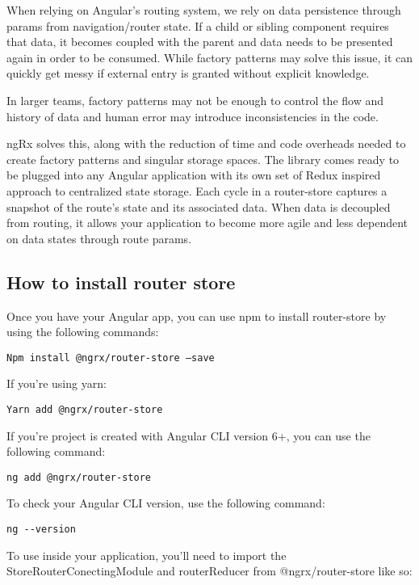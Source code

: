 When relying on Angular’s routing system, we rely on data persistence through
params from navigation/router state. If a child or sibling component requires
that data, it becomes coupled with the parent and data needs to be presented
again in order to be consumed. While factory patterns may solve this issue, it
can quickly get messy if external entry is granted without explicit knowledge.

In larger teams, factory patterns may not be enough to control the flow and
history of data and human error may introduce inconsistencies in the code.

ngRx solves this, along with the reduction of time and code overheads needed to
create factory patterns and singular storage spaces. The library comes ready to
be plugged into any Angular application with its own set of Redux inspired
approach to centralized state storage. Each cycle in a router-store captures a
snapshot of the route’s state and its associated data. When data is decoupled
from routing, it allows your application to become more agile and less dependent
on data states through route params.

\subsection{How to install router store}
Once you have your Angular app, you can use npm to install router-store by using the following commands:

\begin{verbatim}
Npm install @ngrx/router-store –save
\end{verbatim}

If you’re using yarn:
\begin{verbatim}
Yarn add @ngrx/router-store
\end{verbatim}

If you’re project is created with Angular CLI version 6+, you can use the
following command:

\begin{verbatim}
ng add @ngrx/router-store
\end{verbatim}

To check your Angular CLI version, use the following command:
\begin{verbatim}
ng --version
\end{verbatim}

To use inside your application, you’ll need to import the StoreRouterConectingModule and routerReducer from @ngrx/router-store like so:

